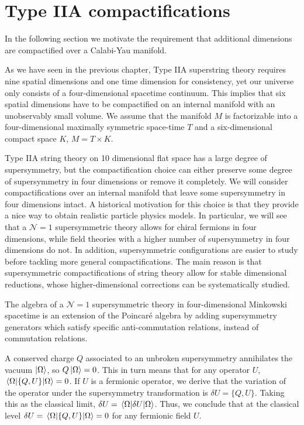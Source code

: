 \chapter{Type IIA compactifications}
In the following section we motivate the requirement that additional dimensions are compactified
over a Calabi-Yau manifold.

As we have seen in the previous chapter, Type IIA superstring theory requires nine spatial dimensions and one time dimension for consistency, yet our universe only consists of a four-dimensional spacetime continuum. This implies that six spatial dimensions have to be compactified on an internal manifold with an unobservably small volume.
We assume that the manifold $M$ is factorizable into a four-dimensional maximally symmetric space-time $T$ and a six-dimensional compact space $K$,
$M =  T\times K$.

Type IIA string theory on 10 dimensional flat space has a large degree of supersymmetry,
but the compactification choice can either preserve some degree of supersymmetry in four dimensions or remove it completely.
We will consider compactifications over an internal manifold that leave some supersymmetry in four dimensions intact.
A historical motivation for this choice is that they provide a nice way to obtain realistic particle 
physics models. 
In particular, we will see that a $\mathcal N=1$ supersymmetric theory allows for chiral fermions in four dimensions, while field theories with a higher number of supersymmetry in four dimensions do not.
In addition, supersymmetric configurations are easier to study before tackling more general compactifications.
The main reason is that supersymmetric compactifications of string theory allow  for stable dimensional reductions, whose higher-dimensional corrections can be systematically studied.

The algebra of a $\mathcal N=1$ supersymmetric theory in four-dimensional Minkowski spacetime is an extension of the Poincaré algebra by adding
 supersymmetry generators which satisfy specific anti-commutation relations, instead of commutation relations. 

A conserved charge $Q$ associated to an unbroken supersymmetry annihilates the vacuum $\ket{\Omega}$,
so $Q\ket{\Omega}=0$.
This in turn means that for any operator $U$, $\ev{ \{Q,U\} }{\Omega}=0$.
If $U$ is a fermionic operator, we derive that the variation of the operator under the supersymmetry
transformation is $\delta U = \{ Q, U\}$.
Taking this as the classical limit, $\delta U = \ev{\delta U}{\Omega}$.
Thus, we conclude that at the classical level $\delta U =\ev{ \{Q,U\} }{\Omega}= 0$ for any fermionic field $U$.

